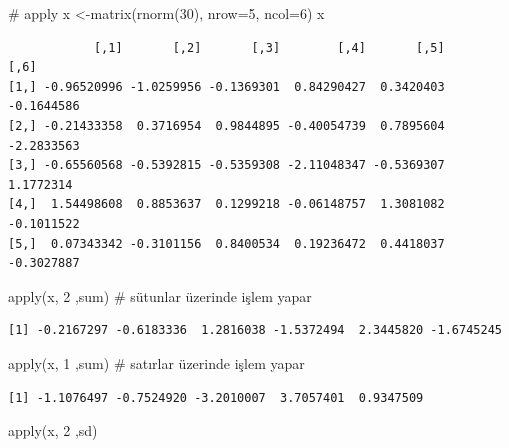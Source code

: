 \documentclass[
  letterpaper,
  DIV=11,
  numbers=noendperiod]{scrreprt}
\newenvironment{Shaded}{\begin{snugshade}}{\end{snugshade}}
\newcommand{\AttributeTok}[1]{\textcolor[rgb]{0.40,0.45,0.13}{#1}}
\newcommand{\CommentTok}[1]{\textcolor[rgb]{0.37,0.37,0.37}{#1}}
\newcommand{\DecValTok}[1]{\textcolor[rgb]{0.68,0.00,0.00}{#1}}
\newcommand{\FunctionTok}[1]{\textcolor[rgb]{0.28,0.35,0.67}{#1}}
\newcommand{\NormalTok}[1]{\textcolor[rgb]{0.00,0.23,0.31}{#1}}
\newcommand{\OtherTok}[1]{\textcolor[rgb]{0.00,0.23,0.31}{#1}}
\begin{document}
\begin{Shaded}
\begin{Highlighting}[]
\CommentTok{\# apply}
\NormalTok{x }\OtherTok{\textless{}{-}}\FunctionTok{matrix}\NormalTok{(}\FunctionTok{rnorm}\NormalTok{(}\DecValTok{30}\NormalTok{), }\AttributeTok{nrow=}\DecValTok{5}\NormalTok{, }\AttributeTok{ncol=}\DecValTok{6}\NormalTok{)}
\NormalTok{x}
\end{Highlighting}
\end{Shaded}

\begin{verbatim}
            [,1]       [,2]       [,3]        [,4]       [,5]       [,6]
[1,] -0.96520996 -1.0259956 -0.1369301  0.84290427  0.3420403 -0.1644586
[2,] -0.21433358  0.3716954  0.9844895 -0.40054739  0.7895604 -2.2833563
[3,] -0.65560568 -0.5392815 -0.5359308 -2.11048347 -0.5369307  1.1772314
[4,]  1.54498608  0.8853637  0.1299218 -0.06148757  1.3081082 -0.1011522
[5,]  0.07343342 -0.3101156  0.8400534  0.19236472  0.4418037 -0.3027887
\end{verbatim}

\begin{Shaded}
\begin{Highlighting}[]
\FunctionTok{apply}\NormalTok{(x, }\DecValTok{2}\NormalTok{ ,sum) }\CommentTok{\# sütunlar üzerinde işlem yapar}
\end{Highlighting}
\end{Shaded}

\begin{verbatim}
[1] -0.2167297 -0.6183336  1.2816038 -1.5372494  2.3445820 -1.6745245
\end{verbatim}

\begin{Shaded}
\begin{Highlighting}[]
\FunctionTok{apply}\NormalTok{(x, }\DecValTok{1}\NormalTok{ ,sum) }\CommentTok{\# satırlar üzerinde işlem yapar}
\end{Highlighting}
\end{Shaded}

\begin{verbatim}
[1] -1.1076497 -0.7524920 -3.2010007  3.7057401  0.9347509
\end{verbatim}

\begin{Shaded}
\begin{Highlighting}[]
\FunctionTok{apply}\NormalTok{(x, }\DecValTok{2}\NormalTok{ ,sd)}
\end{Highlighting}
\end{Shaded}
\end{document}
